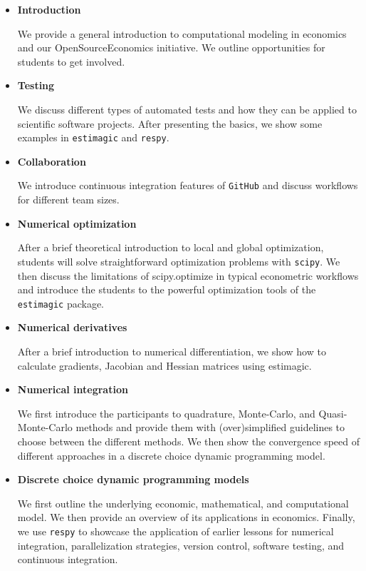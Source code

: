 \begin{itemize}

\item \textbf{Introduction}

We provide a general introduction to computational modeling in economics and our OpenSourceEconomics initiative. We outline opportunities for students to get involved.

\item \textbf{Testing}

We discuss different types of automated tests and how they can be applied to scientific software projects. After presenting the basics, we show some examples in \verb+estimagic+ and \verb+respy+.

\item \textbf{Collaboration}

We introduce continuous integration features of \verb+GitHub+ and discuss workflows for different team sizes.

\item \textbf{Numerical optimization}

After a brief theoretical introduction to local and global optimization, students will solve straightforward optimization problems with \verb+scipy+. We then discuss the limitations of scipy.optimize in typical econometric workflows and introduce the students to the powerful optimization tools of the \verb+estimagic+ package.

\item \textbf{Numerical derivatives}

After a brief introduction to numerical differentiation, we show how to calculate gradients, Jacobian and Hessian matrices using estimagic.

\item \textbf{Numerical integration}

We first introduce the participants to quadrature, Monte-Carlo, and Quasi-Monte-Carlo methods and provide them with (over)simplified guidelines to choose between the different methods. We then show the convergence speed of different approaches in a discrete choice dynamic programming model.

\item \textbf{Discrete choice dynamic programming models}

We first outline the underlying economic, mathematical, and computational model. We then provide an overview of its applications in economics. Finally, we use \verb+respy+ to showcase the application of earlier lessons for numerical integration, parallelization strategies, version control, software testing, and continuous integration.


\end{itemize}
